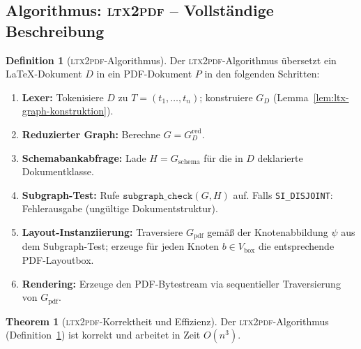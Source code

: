 ﻿\documentclass[a4paper,12pt]{article}
\theoremstyle{definition}
\newtheorem{definition}{Definition}
\newtheorem{theorem}{Theorem}
\begin{document}
\subsection{Algorithmus: \textsc{ltx2pdf} -- Vollständige Beschreibung}
\label{sec:ltx-algorithmus}

\begin{definition}[\textsc{ltx2pdf}-Algorithmus]
	\label{def:ltx2pdf}
	Der \textsc{ltx2pdf}-Algorithmus übersetzt ein \LaTeX-Dokument $D$
	in ein PDF-Dokument $P$ in den folgenden Schritten:
	\begin{enumerate}
		\item \textbf{Lexer:} Tokenisiere $D$ zu $T = (t_1, \ldots, t_n)$;
		konstruiere $G_D$ (Lemma~\ref{lem:ltx-graph-konstruktion}).
		\item \textbf{Reduzierter Graph:} Berechne $G = G_D^{\mathrm{red}}$.
		\item \textbf{Schemabankabfrage:} Lade $H = G_{\mathrm{schema}}$
		für die in $D$ deklarierte Dokumentklasse.
		\item \textbf{Subgraph-Test:} Rufe $\texttt{subgraph\_check}(G, H)$ auf.
		Falls \texttt{SI\_DISJOINT}: Fehlerausgabe (ungültige Dokumentstruktur).
		\item \textbf{Layout-Instanziierung:} Traversiere $G_{\mathrm{pdf}}$
		gemäß der Knotenabbildung $\psi$ aus dem Subgraph-Test;
		erzeuge für jeden Knoten $b \in V_{\mathrm{box}}$ die
		entsprechende PDF-Layoutbox.
		\item \textbf{Rendering:} Erzeuge den PDF-Bytestream via
		sequentieller Traversierung von $G_{\mathrm{pdf}}$.
	\end{enumerate}
\end{definition}

\begin{theorem}[\textsc{ltx2pdf}-Korrektheit und Effizienz]
	\label{thm:ltx2pdf}
	Der \textsc{ltx2pdf}-Algorithmus (Definition~\ref{def:ltx2pdf}) ist
	korrekt und arbeitet in Zeit $O(n^3)$.
\end{theorem}
\end{document}
